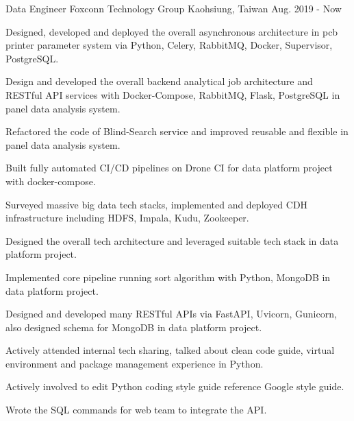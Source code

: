 

\begin{cventries}

  \cventry
    {Data Engineer} %
    {Foxconn Technology Group} %
    {Kaohsiung, Taiwan} %
    {Aug. 2019 - Now} %
    {
      \begin{cvitems} %
        \item {Designed, developed and deployed the overall asynchronous architecture in pcb printer parameter system via Python, Celery, RabbitMQ, Docker, Supervisor, PostgreSQL.}
        \item {Design and developed the overall backend analytical job architecture and RESTful API services with Docker-Compose, RabbitMQ, Flask, PostgreSQL in panel data analysis system.}
        \item {Refactored the code of Blind-Search service and improved reusable and flexible in panel data analysis system.}
        \item {Built fully automated CI/CD pipelines on Drone CI for data platform project with docker-compose.}
        \item {Surveyed massive big data tech stacks, implemented and deployed CDH infrastructure including HDFS, Impala, Kudu, Zookeeper.}
        \item {Designed the overall tech architecture and leveraged suitable tech stack in data platform project.}
        \item {Implemented core pipeline running sort algorithm with Python, MongoDB in data platform project.}
        \item {Designed and developed many RESTful APIs via FastAPI, Uvicorn, Gunicorn, also designed schema for MongoDB in data platform project.}
        \item {Actively attended internal tech sharing, talked about clean code guide, virtual environment and package management experience in Python.}
        \item {Actively involved to edit Python coding style guide reference Google style guide.}
        \item {Wrote the SQL commands for web team to integrate the API.}
      \end{cvitems}
    }


\end{cventries}
